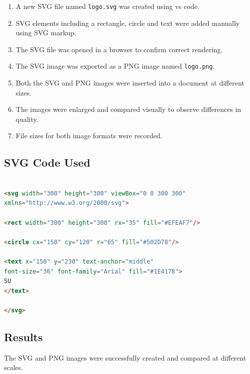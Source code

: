 \documentclass[12pt,a4paper]{article}
\begin{document}
\begin{enumerate}
    \item A new SVG file named \texttt{logo.svg} was created using vs code.
    
    \item SVG elements including a rectangle, circle and text were added manually using SVG markup.
    
    \item The SVG file was opened in a browser to confirm correct rendering.
    
    \item The SVG image was exported as a PNG image named \texttt{logo.png}.
    
    \item Both the SVG and PNG images were inserted into a document at different sizes.
    
    \item The images were enlarged and compared visually to observe differences in quality.
    
    \item File sizes for both image formats were recorded.
\end{enumerate}

\subsection{SVG Code Used}

\begin{lstlisting}[language=HTML, basicstyle=\ttfamily\small, frame=single]

<svg width="300" height="300" viewBox="0 0 300 300"
xmlns="http://www.w3.org/2000/svg">

<rect width="300" height="300" rx="35" fill="#EFEAF7"/>

<circle cx="150" cy="120" r="65" fill="#502D78"/>

<text x="150" y="230" text-anchor="middle"
font-size="36" font-family="Arial" fill="#1E4178">
SU
</text>

</svg>

\end{lstlisting}

\subsection{Results}

The SVG and PNG images were successfully created and compared at different scales.
\end{document}
